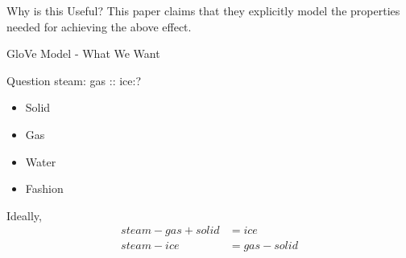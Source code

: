 \begin{frame}{Why is this Useful?}
  This paper claims that they explicitly model the properties needed for achieving the above effect.

\end{frame}
\begin{frame}{GloVe Model - What We Want}
  \begin{exampleblock}{Question}
    steam: gas :: ice:?
    \pause
    \begin{itemize}[<+->]
    \item Solid
    \item Gas
    \item Water
    \item Fashion
    \end{itemize}
  \end{exampleblock}
  Ideally,
  \begin{align*} 
  steam - gas + solid &= ice \\
  steam - ice &= gas - solid \\
  \end{align*}
\end{frame}

